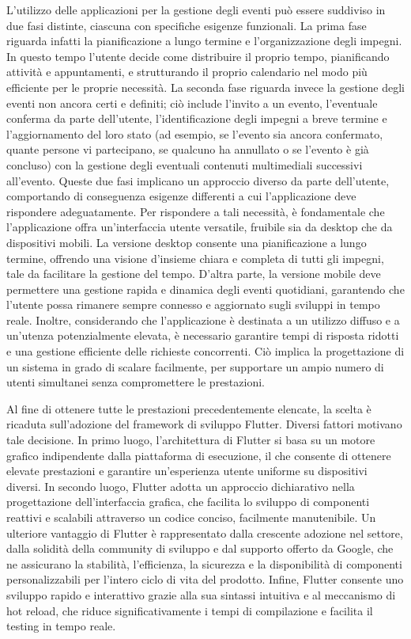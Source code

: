 L’utilizzo delle applicazioni per la gestione degli eventi può essere suddiviso in due fasi distinte, ciascuna con specifiche esigenze funzionali. 
La prima fase riguarda infatti la pianificazione a lungo termine e l’organizzazione degli impegni. In questo tempo l’utente decide come distribuire il proprio tempo, pianificando attività e appuntamenti, e strutturando il proprio calendario nel modo più efficiente per le proprie necessità. 
La seconda fase riguarda invece la gestione degli eventi non ancora certi e definiti; ciò include l’invito a un evento, l’eventuale conferma da parte dell’utente, l’identificazione degli impegni a breve termine e l’aggiornamento del loro stato (ad esempio, se l’evento sia ancora confermato, quante persone vi partecipano, se qualcuno ha annullato o se l'evento è già concluso) con la gestione degli eventuali contenuti multimediali successivi all’evento. Queste due fasi implicano un approccio diverso da parte dell’utente, comportando di conseguenza esigenze differenti a cui l’applicazione deve rispondere adeguatamente. 
Per rispondere a tali necessità, è fondamentale che l'applicazione offra un'interfaccia utente versatile, fruibile sia da desktop che da dispositivi mobili. La versione desktop consente una pianificazione a lungo termine, offrendo una visione d'insieme chiara e completa di tutti gli impegni, tale da facilitare la gestione del tempo. D'altra parte, la versione mobile deve permettere una gestione rapida e dinamica degli eventi quotidiani, garantendo che l'utente possa rimanere sempre connesso e aggiornato sugli sviluppi in tempo reale.
Inoltre, considerando che l'applicazione è destinata a un utilizzo diffuso e a un'utenza potenzialmente elevata, è necessario garantire tempi di risposta ridotti e una gestione efficiente delle richieste concorrenti. Ciò implica la progettazione di un sistema in grado di scalare facilmente, per supportare un ampio numero di utenti simultanei senza compromettere le prestazioni.

Al fine di ottenere tutte le prestazioni precedentemente elencate, la scelta è ricaduta sull’adozione del framework di sviluppo Flutter. Diversi fattori motivano tale decisione. 
In primo luogo, l'architettura di Flutter si basa su un motore grafico indipendente dalla piattaforma di esecuzione, il che consente di ottenere elevate prestazioni e garantire un'esperienza utente uniforme su dispositivi diversi. 
In secondo luogo, Flutter adotta un approccio dichiarativo nella progettazione dell'interfaccia grafica, che facilita lo sviluppo di componenti reattivi e scalabili attraverso un codice conciso, facilmente manutenibile.
Un ulteriore vantaggio di Flutter è rappresentato dalla crescente adozione nel settore, dalla solidità della community di sviluppo e dal supporto offerto da Google, che ne assicurano la stabilità, l'efficienza, la sicurezza e la disponibilità di componenti personalizzabili per l'intero ciclo di vita del prodotto. 
Infine, Flutter consente uno sviluppo rapido e interattivo grazie alla sua sintassi intuitiva e al meccanismo di hot reload, che riduce significativamente i tempi di compilazione e facilita il testing in tempo reale.

